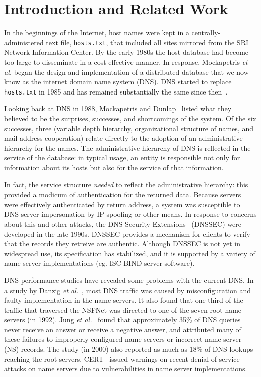 \section{Introduction and Related Work}

In the beginnings of the Internet, host names were kept
in a centrally-administered text file, {\tt hosts.txt}, that
included all sites mirrored from the SRI Network Information Center.
By the early 1980s the host database had become too large
to disseminate in a cost-effective manner.
In response, Mockapetris {\it et al.} began the design and
implementation of a distributed database that we now know
as the internet domain name system (DNS).
DNS started to replace {\tt hosts.txt} in 1985 and has remained
substantially the same since then~\cite{dns-concept:rfc, dns}.

Looking back at DNS in 1988, Mockapetris and Dunlap~\cite{dns}
listed what they believed to be the surprises, successes,
and shortcomings of the system.  Of the six successes,
three (variable depth hierarchy, organizational structure
of names, and mail address cooperation) relate directly 
to the adoption of an administrative hierarchy for the names.
The administrative hierarchy of DNS is reflected in the 
service of the database: in typical usage, an
entity is responsible not only for information about its hosts
but also for the service of that information.

In fact, the service structure {\em needed} to reflect the 
administrative hierarchy: this provided a modicum of authentication
for the returned data.
Because servers were effectively authenticated by return address,
a system was susceptible to DNS server impersonation by 
IP spoofing or other means.
In response to concerns about this and
other attacks, the DNS Security Extensions~\cite{dnssec:rfc}
 (DNSSEC) were developed in the late 1990s.
DNSSEC provides a mechanism for clients to verify that the
records they retreive are authentic.
Although DNSSEC is not yet in widespread use, its specification
has stabilized, and it is supported by a variety of name server
implementations (eg. ISC BIND server software). 

DNS performance studies have revealed some problems with the
current DNS. In a study by Danzig {\it et al.}~\cite{dnsroot:sigcomm92},
most DNS traffic was caused by misconfiguration and faulty implementation
in the name servers. It also found that one third of the 
traffic that traversed the NSFNet was directed to one of 
the seven root name servers (in 1992). 
Jung {\it et al.}~\cite{dnscache:sigcommimw01}
found that approximately 35\% of DNS queries never receive
an answer or receive a negative answer, and attributed
many of these failures to 
improperly configured name servers or incorrect name server (NS) records.
The study (in 2000) also reported as much as 18\% of DNS lookups 
reaching the root servers. 
CERT~\cite{cert} issued warnings on recent 
denial-of-service attacks on name 
servers due to vulnerabilities in name server implementations.

